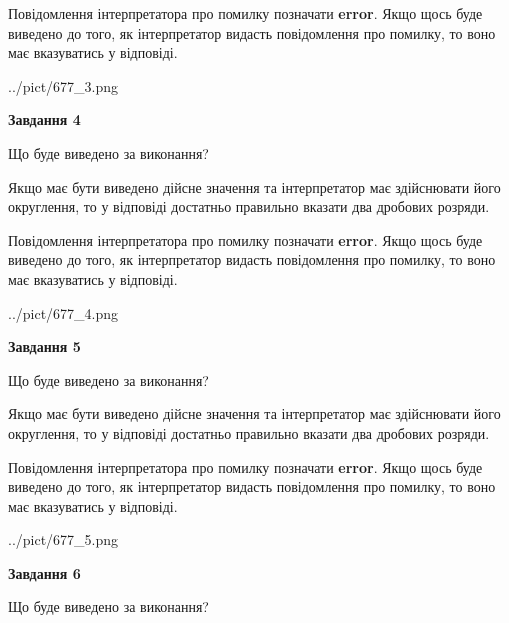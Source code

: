 \documentclass[12pt, ukrainian]{article}
\begin{document}
{\begin {Large}
Повідомлення інтерпретатора про помилку позначати \textbf{error}.
Якщо щось буде виведено до того, як інтерпретатор видасть повідомлення про помилку, 
то воно має вказуватись у відповіді. \par

\begin{center}
	{../pict/677_3.png}
\end{center}
\newpage

{\begin {center}\textbf{Завдання 4}\end {center}}\par
Що буде виведено за виконання? \par

Якщо має бути виведено дійсне значення та інтерпретатор має здійснювати його округлення, 
то у відповіді достатньо правильно вказати два дробових розряди.

Повідомлення інтерпретатора про помилку позначати \textbf{error}.
Якщо щось буде виведено до того, як інтерпретатор видасть повідомлення про помилку, 
то воно має вказуватись у відповіді. \par

\begin{center}
	{../pict/677_4.png}
\end{center}
\newpage

{\begin {center}\textbf{Завдання 5}\end {center}}\par
Що буде виведено за виконання? \par

Якщо має бути виведено дійсне значення та інтерпретатор має здійснювати його округлення, 
то у відповіді достатньо правильно вказати два дробових розряди.

Повідомлення інтерпретатора про помилку позначати \textbf{error}.
Якщо щось буде виведено до того, як інтерпретатор видасть повідомлення про помилку, 
то воно має вказуватись у відповіді. \par

\begin{center}
	{../pict/677_5.png}
\end{center}
\newpage

{\begin {center}\textbf{Завдання 6}\end {center}}\par
Що буде виведено за виконання? \par


\end{Large}}
\end{document}
